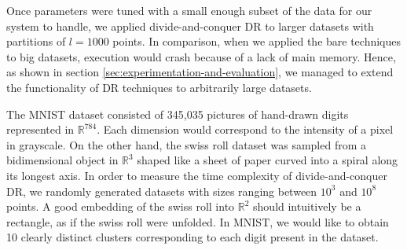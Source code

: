 Once parameters were tuned with a small enough subset of the data for our system to handle, we applied divide-and-conquer DR to larger datasets with partitions of $l=1000$ points. In comparison, when we applied the bare techniques to big datasets, execution would crash because of a lack of main memory. Hence, as shown in section \ref{sec:experimentation-and-evaluation}, we managed to extend the functionality of DR techniques to arbitrarily large datasets.

The MNIST dataset consisted of 345,035 pictures of hand-drawn digits represented in $\mathbb{R}^{784}$. Each dimension would correspond to the intensity of a pixel in grayscale. On the other hand, the swiss roll dataset was sampled from a bidimensional object in $\mathbb{R}^3$ shaped like a sheet of paper curved into a spiral along its longest axis. In order to measure the time complexity of divide-and-conquer DR, we randomly generated datasets with sizes ranging between $10^3$ and $10^8$ points. A good embedding of the swiss roll into $\mathbb{R}^2$ should intuitively be a rectangle, as if the swiss roll were unfolded. In MNIST, we would like to obtain 10 clearly distinct clusters corresponding to each digit present in the dataset.